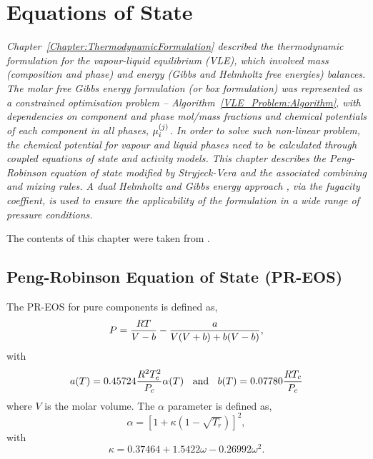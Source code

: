 

\chapter{Equations of State}\label{Chapter:EOSPR}

\begin{adjustwidth}{1cm}{1cm}
    {\it Chapter~\ref{Chapter:ThermodynamicFormulation} described the thermodynamic formulation for the vapour-liquid equilibrium (VLE), which involved mass (composition and phase) and energy (Gibbs and Helmholtz free energies) balances. The molar free Gibbs energy formulation (or box formulation) was represented as a constrained optimisation problem -- Algorithm~\ref{VLE_Problem:Algorithm}, with dependencies on component and phase mol/mass fractions and chemical potentials of each component in all phases, $\mfr[\mu]{i}{j}$. In order to solve such non-linear problem, the chemical potential for vapour and liquid phases  need to be calculated through coupled equations of state and activity models. This chapter describes the Peng-Robinson equation of state modified by Stryjeck-Vera and the associated combining and mixing rules. A dual Helmholtz and Gibbs energy approach \citep{wong_1992}, via the fugacity coeffient, is used to ensure the applicability of the formulation in a wide range of pressure conditions.

\medskip

The contents of this chapter were taken from \citet{Gomes_MSc_1999} \citep[see also][]{gomes_2001}.
}
\end{adjustwidth}
\section{Peng-Robinson Equation of State (PR-EOS)}\label{Chapter:EOSPR:Section:PR}
The PR-EOS for pure components is defined as,
   \begin{equation}
      P = \frc{RT}{V-b} - \frc{a}{V(V+b) + b(V-b)}\label{Chapter:EOSPR:Section:PR:Eqn:PR},
   \end{equation}
with
   \begin{displaymath}
      a(T)=0.45724\frc{R^{2}T_{c}^{2}}{P_{c}}\alpha(T)\;\;\text{ and }\;\;b(T) = 0.07780\frc{RT_{c}}{P_{c}}
   \end{displaymath}
where $V$ is the molar volume. The $\alpha$ parameter is defined as,
   \begin{equation}
         \alpha = \left[1 + \kappa\left(1 - \sqrt{T_{r}}\right)\right]^{2},
   \end{equation}
with
   \begin{equation}
         \kappa = 0.37464 + 1.5422\omega - 0.26992\omega^{2}.\label{Chapter:EOSPR:Section:PR:Eqn:PR_k}
   \end{equation}

